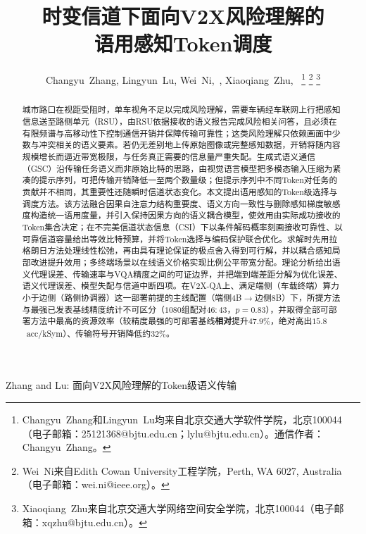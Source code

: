 \documentclass[journal]{IEEEtran}
\begin{document}
\title{时变信道下面向V2X风险理解的\\语用感知Token调度}

\author{Changyu~Zhang, Lingyun~Lu, Wei~Ni,~, Xiaoqiang~Zhu,~
\thanks{Changyu~Zhang和Lingyun~Lu均来自北京交通大学软件学院，北京100044（电子邮箱：25121368@bjtu.edu.cn；lylu@bjtu.edu.cn）。通信作者：Changyu~Zhang。}
\thanks{Wei~Ni来自Edith Cowan University工程学院，Perth, WA 6027, Australia（电子邮箱：wei.ni@ieee.org）。}
\thanks{Xiaoqiang~Zhu来自北京交通大学网络空间安全学院，北京100044（电子邮箱：xqzhu@bjtu.edu.cn）。}}

%
{Zhang and Lu: 面向V2X风险理解的Token级语义传输}

\maketitle

\begin{abstract}
城市路口在视距受阻时，单车视角不足以完成风险理解，需要车辆经车联网上行把感知信息送至路侧单元（RSU），由RSU依据接收的语义报告完成风险相关问答，且必须在有限频谱与高移动性下控制通信开销并保障传输可靠性；这类风险理解只依赖画面中少数与冲突相关的语义要素。若仍无差别地上传原始图像或完整感知数据，开销将随内容规模增长而逼近带宽极限，与任务真正需要的信息量严重失配。生成式语义通信（GSC）沿传输任务语义而非原始比特的思路，由视觉语言模型把多模态输入压缩为紧凑的提示序列，可把传输开销降低一至两个数量级；但提示序列中不同Token对任务的贡献并不相同，其重要性还随瞬时信道状态变化。本文提出语用感知的Token级选择与调度方法。该方法融合因果自注意力结构重要度、语义方向一致性与删除感知梯度敏感度构造统一语用度量，并引入保持因果方向的语义耦合模型，使效用由实际成功接收的Token集合决定；在不完美信道状态信息（CSI）下以条件解码概率刻画接收可靠性、以可靠信道容量给出等效比特预算，并将Token选择与编码保护联合优化。求解时先用拉格朗日方法处理线性松弛，再由具有理论保证的极点舍入得到可行解，并以耦合感知局部改进提升效用；多终端场景以在线语义价格实现比例公平带宽分配。理论分析给出语义代理误差、传输速率与VQA精度之间的可证边界，并把端到端差距分解为优化误差、语义代理误差、模型失配与信道中断四项。在V2X-QA上、满足端侧（车载终端）算力小于边侧（路侧协调器）这一部署前提的主线配置（端侧4B$\rightarrow$边侧8B）下，所提方法与最强已发表基线精度统计不可区分（$1080$组配对$46{:}43$，$p=0.83$），并取得全部可部署方法中最高的资源效率（较精度最强的可部署基线\textbf{相对}提升$47.9\%$，绝对高出$15.8$~acc/kSym）、传输符号开销降低约$32\%$。
\end{abstract}
\end{document}
